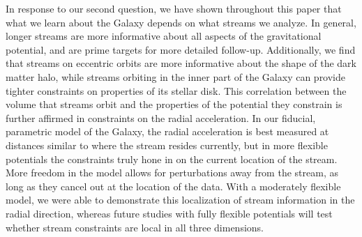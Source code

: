 \documentclass[modern]{aastex61}
\begin{document}
In response to our second question, we have shown throughout this paper that what we learn about the Galaxy depends on what streams we analyze.
In general, longer streams are more informative about all aspects of the gravitational potential, and are prime targets for more detailed follow-up.
Additionally, we find that streams on eccentric orbits are more informative about the shape of the dark matter halo, while streams orbiting in the inner part of the Galaxy can provide tighter constraints on properties of its stellar disk.
This correlation between the volume that streams orbit and the properties of the potential they constrain is further affirmed in constraints on the radial acceleration.
In our fiducial, parametric model of the Galaxy, the radial acceleration is best measured at distances similar to where the stream resides currently, but in more flexible potentials the constraints truly hone in on the current location of the stream.
More freedom in the model allows for perturbations away from the stream, as long as they cancel out at the location of the data.
With a moderately flexible model, we were able to demonstrate this localization of stream information in the radial direction, whereas future studies with fully flexible potentials will test whether stream constraints are local in all three dimensions.



\end{document}
